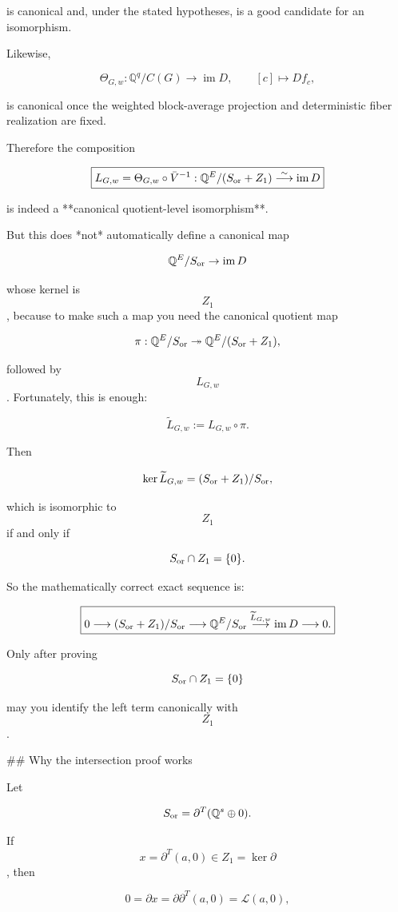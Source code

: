 is canonical and, under the stated hypotheses, is a good candidate for an isomorphism.

Likewise,

$$
\Theta_{G,w}:
\mathbb Q^q/C(G)
\longrightarrow
\operatorname{im}D,
\qquad
[c]\longmapsto Df_c,
$$

is canonical once the weighted block-average projection and deterministic fiber realization are fixed.

Therefore the composition

$$
\boxed{
L_{G,w}
=
\Theta_{G,w}\circ\bar V^{-1}:
\mathbb Q^E/(S_{\rm or}+Z_1)
\overset{\sim}{\longrightarrow}
\operatorname{im}D
}
$$

is indeed a **canonical quotient-level isomorphism**.

But this does *not* automatically define a canonical map

$$
\mathbb Q^E/S_{\rm or}\to\operatorname{im}D
$$

whose kernel is $$Z_1$$, because to make such a map you need the canonical quotient map

$$
\pi:\mathbb Q^E/S_{\rm or}
\twoheadrightarrow
\mathbb Q^E/(S_{\rm or}+Z_1),
$$

followed by $$L_{G,w}$$. Fortunately, this is enough:

$$
\widetilde L_{G,w}
:=
L_{G,w}\circ\pi.
$$

Then

$$
\ker\widetilde L_{G,w}
=
(S_{\rm or}+Z_1)/S_{\rm or},
$$

which is isomorphic to $$Z_1$$ if and only if

$$
S_{\rm or}\cap Z_1=\{0\}.
$$

So the mathematically correct exact sequence is:

$$
\boxed{
0\longrightarrow
(S_{\rm or}+Z_1)/S_{\rm or}
\longrightarrow
\mathbb Q^E/S_{\rm or}
\overset{\widetilde L_{G,w}}{\longrightarrow}
\operatorname{im}D
\longrightarrow0.
}
$$

Only after proving

$$
S_{\rm or}\cap Z_1=\{0\}
$$

may you identify the left term canonically with $$Z_1$$.

## Why the intersection proof works

Let

$$
S_{\rm or}
=
\partial^T(\mathbb Q^s\oplus0).
$$

If $$x=\partial^T(a,0)\in Z_1=\ker\partial$$, then

$$
0=\partial x
=
\partial\partial^T(a,0)
=
\mathcal L(a,0),
$$

